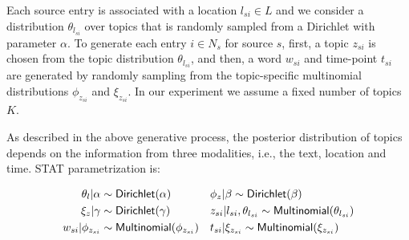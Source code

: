 \documentclass[conference]{IEEEtran}
\newcommand{\model}{{STAT}\xspace} %
\begin{document}
Each source entry is associated with a location $l_{si} \in L$ and we consider a distribution $\theta_{l_{si}}$ over topics that is randomly sampled from a Dirichlet with parameter $\alpha$. To generate each entry $i \in N_s$ for source $s$, first, a topic $z_{si}$ is chosen from the topic distribution $\theta_{l_{si}}$, and then, a word $w_{si}$ and time-point $t_{si}$ are generated by randomly sampling from the topic-specific multinomial distributions $\phi_{z_{si}}$ and $\xi_{z_{si}}$.  In our experiment we assume a fixed number of topics $K$.

As described in the above generative process, the posterior distribution of topics depends on the information from three modalities, i.e., the text, location and time. \model parametrization is:

{\small
\begin{align}
\theta_{l}|\alpha & \sim {\sf Dirichlet}(\alpha) &&  \phi_{z}|\beta \sim {\sf Dirichlet}(\beta) \nonumber \\
\xi_{z}|\gamma & \sim {\sf Dirichlet}(\gamma) &&  z_{si}|l_{si},\theta_{l_{si}} \sim {\sf Multinomial}(\theta_{l_{si}}) \nonumber \\
w_{si}|\phi_{z_{si}} & \sim {\sf Multinomial}(\phi_{z_{si}}) && t_{si}|\xi_{z_{si}} \sim {\sf Multinomial}(\xi_{z_{si}}) \nonumber
\end{align}}
\end{document}
